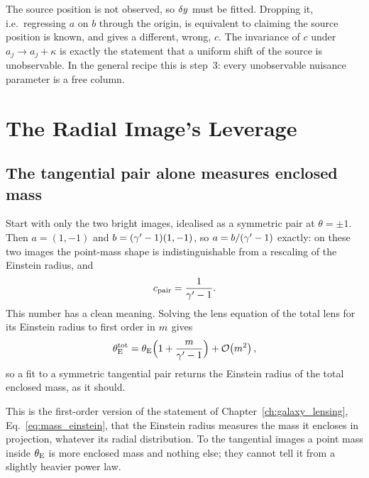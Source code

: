\begin{keybox}
The source position is not observed, so $\delta y$ must be fitted.
Dropping it, i.e.\ regressing $a$ on $b$ through the origin, is
equivalent to claiming the source position is known, and gives a
different, wrong, $c$. The invariance of $c$ under $a_j\to a_j+\kappa$
is exactly the statement that a uniform shift of the source is
unobservable. In the general recipe this is step~3: every unobservable
nuisance parameter is a free column.
\end{keybox}

\section{The Radial Image's Leverage}
\label{sec:pe_leverage}

\subsection{The tangential pair alone measures enclosed mass}

Start with only the two bright images, idealised as a symmetric pair at
$\theta=\pm1$. Then $a=(1,-1)$ and $b=(\gamma'-1)(1,-1)$, so $a=b/(\gamma'-1)$
exactly: on these two images the point-mass shape is
indistinguishable from a rescaling of the Einstein radius, and
\begin{equation}
    c_{\rm pair}=\frac{1}{\gamma'-1}.
    \label{eq:pe_floor}
\end{equation}
This number has a clean meaning. Solving the lens equation of the
total lens for its Einstein radius to first order in $m$
gives
\begin{equation}
    \theta_{\mathrm{E}}^{\rm tot}=\theta_{\mathrm{E}}\Bigl(1+\frac{m}{\gamma'-1}\Bigr)+\mathcal{O}\!\left(m^2\right),
    \label{eq:pe_total_mass}
\end{equation}
so a fit to a symmetric tangential pair returns the Einstein
radius of the total enclosed mass, as it should.

\begin{bridge}
This is the first-order version of the statement of
Chapter~\ref{ch:galaxy_lensing}, Eq.~\eqref{eq:mass_einstein}, that the
Einstein radius measures the mass it encloses in projection, whatever its
radial distribution. To the tangential images a point mass inside
$\theta_{\mathrm{E}}$ is more enclosed mass and nothing else; they cannot tell it
from a slightly heavier power law.
\end{bridge}

